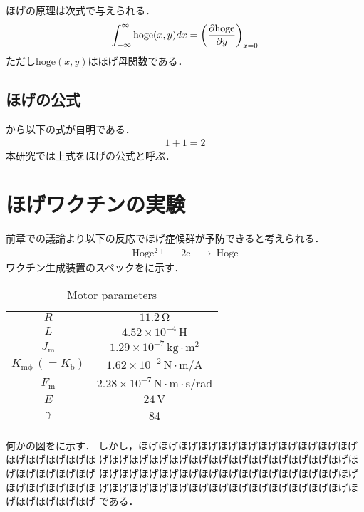 \begin{small}
ほげの原理は次式で与えられる\cite{Hondo:JRSJ2011}．
\begin{eqnarray}
\int_{-\infty}^\infty \mathrm{hoge}(x,y) dx = \left( \pdiff{\mathrm{hoge}}{y} \right)_{x = 0}
\equlabel{hoge}
\end{eqnarray}
ただし$\mathrm{hoge}(x,y)$はほげ母関数である．

\subsection{ほげの公式}
から以下の式が自明である．
\begin{eqnarray}
1 + 1 = 2
\end{eqnarray}
本研究では上式をほげの公式と呼ぶ．

\section{ほげワクチンの実験}

前章での議論より以下の反応でほげ症候群が予防できると考えられる．
\begin{eqnarray}
\mathrm{Hoge^{2+} \ + 2e^{-} \ \rightarrow \ Hoge}
\end{eqnarray}
ワクチン生成装置のスペックをに示す．

\begin{table}[b]
\caption{Motor parameters}
\begin{center}
\begin{tabular}{c c}
\toprule
$R$ & $11.2\,\mathrm{\Omega}$ \\
$L$ & $4.52 \times 10^{-4}\,\mathrm{H}$ \\
$J_\mathrm{m}$ & $1.29 \times 10^{-7}\,\mathrm{kg \cdot m^2}$ \\
$K_\mathrm{m\phi}\,(=K_\mathrm{b})$ & $1.62 \times 10^{-2}\,\mathrm{N \cdot m / A}$ \\
$F_\mathrm{m}$ & $2.28 \times 10^{-7}\,\mathrm{N \cdot m \cdot s / rad}$ \\
$E$ & $24\,\mathrm{V}$ \\
$\gamma$ & 84 \\
\bottomrule
\end{tabular}
\end{center}
\end{table}


何かの図をに示す．
しかし，ほげほげほげほげほげほげほげほげほげほげほげほげほげほげほげほ
げほげほげほげほげほげほげほげほげほげほげほげほげほげほげほげほげほげ
ほげほげほげほげほげほげほげほげほげほげほげほげほげほげほげほげほげほ
げほげほげほげほげほげほげほげほげほげほげほげほげほげほげほげほげほげ
である．


\end{small}
